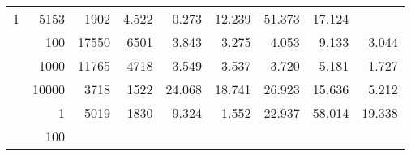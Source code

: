 \begin{table}
\begin{tabular}{rrrrrrrrr}
					
					 
					\multirow{ 1 }{*}{ 1 } &
					
						
							    
							     5153  & 1902  
	                           & 4.522 & 0.273 & 12.239
	                           & 51.373 & 17.124  \\
	                
	            
					 &  
					 
					\multirow{ 1 }{*}{ 100 } &
					
						
							    
							     17550  & 6501  
	                           & 3.843 & 3.275 & 4.053
	                           & 9.133 & 3.044  \\
	                
	            
					 &  
					 
					\multirow{ 1 }{*}{ 1000 } &
					
						
							    
							     11765  & 4718  
	                           & 3.549 & 3.537 & 3.720
	                           & 5.181 & 1.727  \\
	                
	            
					 &  
					 
					\multirow{ 1 }{*}{ 10000 } &
					
						
							    
							     3718  & 1522  
	                           & 24.068 & 18.741 & 26.923
	                           & 15.636 & 5.212  \\
	                
	            
	        
				\noalign{\smallskip}\hline
				\multirow{ 4 }{*}{ 2000000 } &
				
					
					 
					\multirow{ 1 }{*}{ 1 } &
					
						
							    
							     5019  & 1830  
	                           & 9.324 & 1.552 & 22.937
	                           & 58.014 & 19.338  \\
	                
	            
					 &  
					 
					\multirow{ 1 }{*}{ 100 } &
					
						
							    

\end{tabular}
\end{table}
